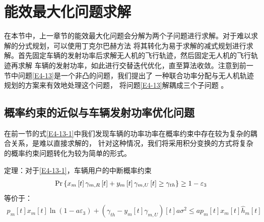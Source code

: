 \section{能效最大化问题求解}\label{section4-3}
在本节中，上一章节的能效最大化问题会分解为两个子问题进行求解。对于难以求解的分式规划，可以使用丁克尔巴赫方法
将其转化为易于求解的减式规划进行求解。首先固定车辆的发射功率后求解无人机的飞行轨迹，然后固定无人机的飞行轨迹再求解
车辆的发射功率，如此进行交替迭代优化，直至算法收敛。注意到前一节中问题\eqref{E4-13}是一个非凸的问题，我们提出了
一种联合功率分配与无人机轨迹规划的方案来有效地处理这个问题，
将问题\eqref{E4-13}解耦成三个子问题 \cite{JointTrajectory9627548}。
\subsection{概率约束的近似与车辆发射功率优化问题}\label{section4-3-1}
在前一节的式\eqref{E4-13-1}中我们发现车辆的功率功率在概率约束中存在较为复杂的耦合关系，是难以直接求解的，
针对这种情况，我们将采用积分变换的方式将复杂的概率约束问题转化为较为简单的形式。

定理：对于\eqref{E4-13-1}，车辆用户的中断概率约束
\begin{align}
\Pr\left\{x_m\left[t\right]\gamma_{m,R}\left[t\right]+y_m\left[t\right]\gamma_{m,U}\left[t\right] \geq \gamma_{th}\right\}\geq1-\varepsilon_3    \notag
\end{align}
等价于：
\begin{equation} \label{E4-14}
\begin{gathered}
p_m\left[t\right]x_m\left[t\right]\ln \left(1-a \varepsilon_3\right)+(\gamma_{th}-y_m\left[t\right]\gamma_{m,U})\left[t\right] a \sigma^2
\leq a p_m\left[t\right]x_m\left[t\right]\hat{h}_{m}\left[t\right]
\end{gathered}
\end{equation}

